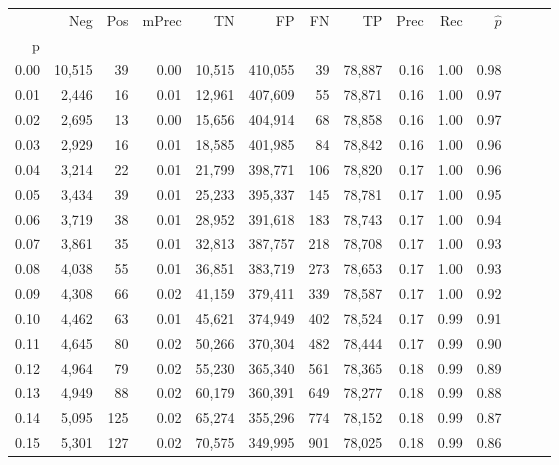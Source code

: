 \begin{tabular}{rrrrrrrrrrrrrr}
\toprule
{} &     Neg &    Pos & mPrec &       TN &       FP &      FN &      TP &  Prec &   Rec & $\hat{p}$ \\
p    &         &        &       &          &          &         &         &       &       &           \\
\midrule
0.00 &  10,515 &     39 &  0.00 &   10,515 &  410,055 &      39 &  78,887 &  0.16 &  1.00 &      0.98 \\
0.01 &   2,446 &     16 &  0.01 &   12,961 &  407,609 &      55 &  78,871 &  0.16 &  1.00 &      0.97 \\
0.02 &   2,695 &     13 &  0.00 &   15,656 &  404,914 &      68 &  78,858 &  0.16 &  1.00 &      0.97 \\
0.03 &   2,929 &     16 &  0.01 &   18,585 &  401,985 &      84 &  78,842 &  0.16 &  1.00 &      0.96 \\
0.04 &   3,214 &     22 &  0.01 &   21,799 &  398,771 &     106 &  78,820 &  0.17 &  1.00 &      0.96 \\
0.05 &   3,434 &     39 &  0.01 &   25,233 &  395,337 &     145 &  78,781 &  0.17 &  1.00 &      0.95 \\
0.06 &   3,719 &     38 &  0.01 &   28,952 &  391,618 &     183 &  78,743 &  0.17 &  1.00 &      0.94 \\
0.07 &   3,861 &     35 &  0.01 &   32,813 &  387,757 &     218 &  78,708 &  0.17 &  1.00 &      0.93 \\
0.08 &   4,038 &     55 &  0.01 &   36,851 &  383,719 &     273 &  78,653 &  0.17 &  1.00 &      0.93 \\
0.09 &   4,308 &     66 &  0.02 &   41,159 &  379,411 &     339 &  78,587 &  0.17 &  1.00 &      0.92 \\
0.10 &   4,462 &     63 &  0.01 &   45,621 &  374,949 &     402 &  78,524 &  0.17 &  0.99 &      0.91 \\
0.11 &   4,645 &     80 &  0.02 &   50,266 &  370,304 &     482 &  78,444 &  0.17 &  0.99 &      0.90 \\
0.12 &   4,964 &     79 &  0.02 &   55,230 &  365,340 &     561 &  78,365 &  0.18 &  0.99 &      0.89 \\
0.13 &   4,949 &     88 &  0.02 &   60,179 &  360,391 &     649 &  78,277 &  0.18 &  0.99 &      0.88 \\
0.14 &   5,095 &    125 &  0.02 &   65,274 &  355,296 &     774 &  78,152 &  0.18 &  0.99 &      0.87 \\
0.15 &   5,301 &    127 &  0.02 &   70,575 &  349,995 &     901 &  78,025 &  0.18 &  0.99 &      0.86 \\

\end{tabular}
